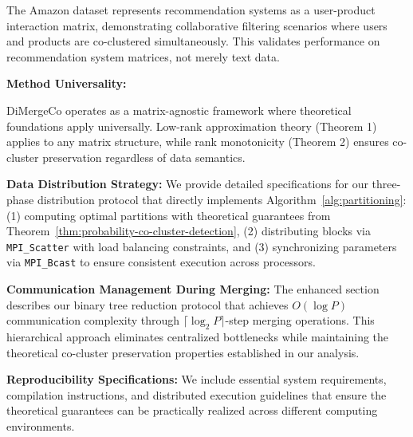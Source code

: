 \documentclass{ar2rc}
\begin{document}
The Amazon dataset represents recommendation systems as a user-product interaction matrix, demonstrating collaborative filtering scenarios where users and products are co-clustered simultaneously. This validates performance on recommendation system matrices, not merely text data.

\textbf{Method Universality:}

DiMergeCo operates as a matrix-agnostic framework where theoretical foundations apply universally. Low-rank approximation theory (Theorem 1) applies to any matrix structure, while rank monotonicity (Theorem 2) ensures co-cluster preservation regardless of data semantics.



\textbf{Data Distribution Strategy:}
We provide detailed specifications for our three-phase distribution protocol that directly implements Algorithm~\ref{alg:partitioning}: (1) computing optimal partitions with theoretical guarantees from Theorem~\ref{thm:probability-co-cluster-detection}, (2) distributing blocks via \texttt{MPI\_Scatter} with load balancing constraints, and (3) synchronizing parameters via \texttt{MPI\_Bcast} to ensure consistent execution across processors.

\textbf{Communication Management During Merging:}
The enhanced section describes our binary tree reduction protocol that achieves $O(\log P)$ communication complexity through $\lceil \log_2 P \rceil$-step merging operations. This hierarchical approach eliminates centralized bottlenecks while maintaining the theoretical co-cluster preservation properties established in our analysis.

\textbf{Reproducibility Specifications:}
We include essential system requirements, compilation instructions, and distributed execution guidelines that ensure the theoretical guarantees can be practically realized across different computing environments.
\end{document}
